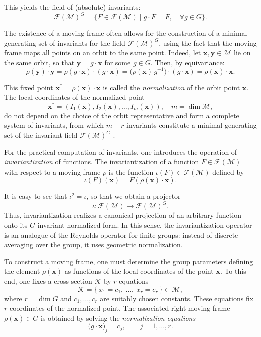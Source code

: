 \documentclass[12pt,reqno]{amsart}
\begin{document}
This yields the field of (absolute) invariants:
$$
\mathcal{F}(\mathcal M)^G = \{ F \in \mathcal{F}(\mathcal M) \mid g \cdot F = F,\quad \forall g \in G \}.
$$

The existence of a moving frame often allows for the construction of a minimal generating set of invariants for the field $\mathcal{F}(\mathcal M)^G$, using the fact that the moving frame maps all points on an orbit to the same point. Indeed, let $\boldsymbol x, \boldsymbol y \in \mathcal M$ lie on the same orbit, so that $\boldsymbol y = g \cdot \boldsymbol x$ for some $g \in G$. Then, by equivariance:
$$
\rho(\boldsymbol y) \cdot \boldsymbol y
= \rho(g \cdot \boldsymbol x) \cdot (g \cdot \boldsymbol x)
= \big(\rho(\boldsymbol x)\, g^{-1} \big) \cdot (g \cdot \boldsymbol x)
= \rho(\boldsymbol x) \cdot \boldsymbol x.
$$

This fixed point $\boldsymbol{x}^* = \rho(\boldsymbol x) \cdot \boldsymbol x$ is called the \textit{normalization} of the orbit point $\boldsymbol x$. The local coordinates of the normalized point
$$
\boldsymbol{x}^* = (I_1(\boldsymbol x), I_2(\boldsymbol x), \ldots, I_m(\boldsymbol x)), \quad m = \dim \mathcal M,
$$
do not depend on the choice of the orbit representative and form a complete system of invariants, from which $m - r$ invariants constitute a minimal generating set of the invariant field $\mathcal{F}(\mathcal M)^G$ \cite[Theorem~4.5]{Olver1999-1}.


\medskip 
For the practical computation of invariants, one introduces the operation of
\textit{invariantization} of functions.
The invariantization of a function $F \in \mathcal F(\mathcal M)$ with respect to a moving frame $\rho$
is the function $\iota(F) \in \mathcal F(\mathcal M)$ defined by
$$
\iota(F)(\boldsymbol x) = F(\rho(\boldsymbol x) \cdot \boldsymbol x).
$$

It is easy to see that $\iota^2 = \iota$, so that we obtain a projector
$$
\iota : \mathcal F(\mathcal M) \to \mathcal F(\mathcal M)^G.
$$
Thus, invariantization realizes a canonical projection of an arbitrary function onto its
$G$-invariant normalized form. In this sense, the invariantization operator is an analogue
of the Reynolds operator for finite groups: instead of discrete averaging over the group,
it uses geometric normalization.

\medskip

To construct a moving frame, one must determine the group parameters defining the element
$\rho(\boldsymbol x)$ as functions of the local coordinates of the point $\boldsymbol x$.
To this end, one fixes a cross-section $\mathcal K$ by $r$ equations
$$
\mathcal{K} = \{\, x_1 = c_1,\ \dots,\ x_r = c_r \,\} \subset \mathcal M,
$$
where $r = \dim G$ and $c_1, \dots, c_r$ are suitably chosen constants. These equations fix
$r$ coordinates of the normalized point.
The associated right moving frame $\rho(\boldsymbol x) \in G$ is obtained by solving
the \textit{normalization equations}
$$
\big(g \cdot \boldsymbol x\big)_j = c_j, \qquad j = 1, \dots, r.
$$
\end{document}
